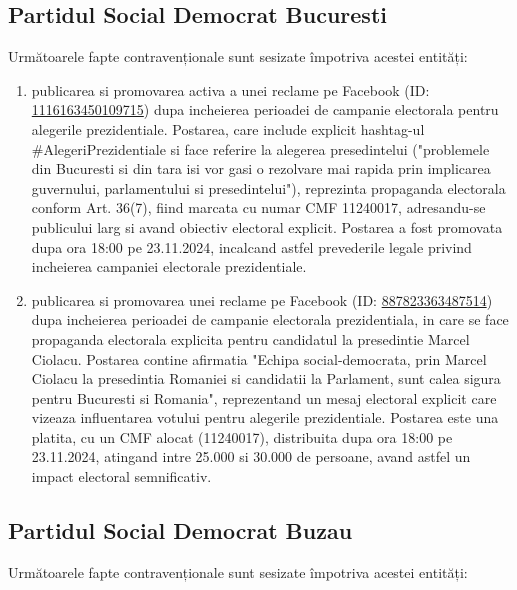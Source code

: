 \documentclass[a4paper,12pt]{article}
\begin{document}
\vspace{0.5cm}

\subsection{Partidul Social Democrat Bucuresti}
Următoarele fapte contravenționale sunt sesizate împotriva acestei entități:

\begin{enumerate}[leftmargin=*, label=\arabic*.)]
    \item publicarea si promovarea activa a unei reclame pe Facebook (ID: \href{https://www.facebook.com/ads/library/?id=1116163450109715}{1116163450109715}) dupa incheierea perioadei de campanie electorala pentru alegerile prezidentiale. Postarea, care include explicit hashtag-ul \#AlegeriPrezidentiale si face referire la alegerea presedintelui ("problemele din Bucuresti si din tara isi vor gasi o rezolvare mai rapida prin implicarea guvernului, parlamentului si presedintelui"), reprezinta propaganda electorala conform Art. 36(7), fiind marcata cu numar CMF 11240017, adresandu-se publicului larg si avand obiectiv electoral explicit. Postarea a fost promovata dupa ora 18:00 pe 23.11.2024, incalcand astfel prevederile legale privind incheierea campaniei electorale prezidentiale.
    \item publicarea si promovarea unei reclame pe Facebook (ID: \href{https://www.facebook.com/ads/library/?id=887823363487514}{887823363487514}) dupa incheierea perioadei de campanie electorala prezidentiala, in care se face propaganda electorala explicita pentru candidatul la presedintie Marcel Ciolacu. Postarea contine afirmatia "Echipa social-democrata, prin Marcel Ciolacu la presedintia Romaniei si candidatii la Parlament, sunt calea sigura pentru Bucuresti si Romania", reprezentand un mesaj electoral explicit care vizeaza influentarea votului pentru alegerile prezidentiale. Postarea este una platita, cu un CMF alocat (11240017), distribuita dupa ora 18:00 pe 23.11.2024, atingand intre 25.000 si 30.000 de persoane, avand astfel un impact electoral semnificativ.
\end{enumerate}

\vspace{0.5cm}

\subsection{Partidul Social Democrat Buzau}
Următoarele fapte contravenționale sunt sesizate împotriva acestei entități:
\end{document}
